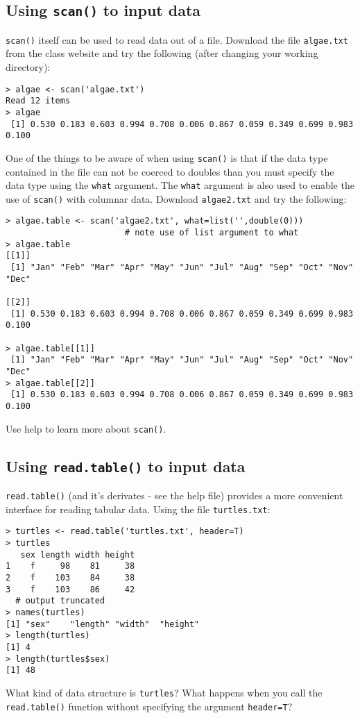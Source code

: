 \documentclass{article}
\begin{document}
\subsection{Using \lstinline!scan()! to input data}

\lstinline!scan()! itself can be used to read data out of a file.
Download the file \lstinline!algae.txt! from the class website and try
the following (after changing your working directory):

\begin{lstlisting}
> algae <- scan('algae.txt')
Read 12 items
> algae
 [1] 0.530 0.183 0.603 0.994 0.708 0.006 0.867 0.059 0.349 0.699 0.983 0.100
\end{lstlisting}
One of the things to be aware of when using \lstinline!scan()! is that
if the data type contained in the file can not be coerced to doubles
than you must specify the data type using the \lstinline!what! argument.
The \lstinline!what! argument is also used to enable the use of
\lstinline!scan()! with columnar data. Download \lstinline!algae2.txt!
and try the following:

\begin{lstlisting}
> algae.table <- scan('algae2.txt', what=list('',double(0))) 
                        # note use of list argument to what
> algae.table
[[1]]
 [1] "Jan" "Feb" "Mar" "Apr" "May" "Jun" "Jul" "Aug" "Sep" "Oct" "Nov" "Dec"

[[2]]
 [1] 0.530 0.183 0.603 0.994 0.708 0.006 0.867 0.059 0.349 0.699 0.983 0.100

> algae.table[[1]]
 [1] "Jan" "Feb" "Mar" "Apr" "May" "Jun" "Jul" "Aug" "Sep" "Oct" "Nov" "Dec"
> algae.table[[2]]
 [1] 0.530 0.183 0.603 0.994 0.708 0.006 0.867 0.059 0.349 0.699 0.983 0.100
\end{lstlisting}
Use help to learn more about \lstinline!scan()!.

\subsection{Using \lstinline!read.table()! to input data}

\lstinline!read.table()! (and it's derivates - see the help file)
provides a more convenient interface for reading tabular data. Using the
file \lstinline!turtles.txt!:

\begin{lstlisting}
> turtles <- read.table('turtles.txt', header=T)
> turtles
   sex length width height
1    f     98    81     38
2    f    103    84     38
3    f    103    86     42
  # output truncated
> names(turtles)
[1] "sex"    "length" "width"  "height"
> length(turtles)
[1] 4
> length(turtles$sex)
[1] 48  
\end{lstlisting}
What kind of data structure is \lstinline!turtles!? What happens when
you call the \lstinline!read.table()! function without specifying the
argument \lstinline!header=T!?
\end{document}
